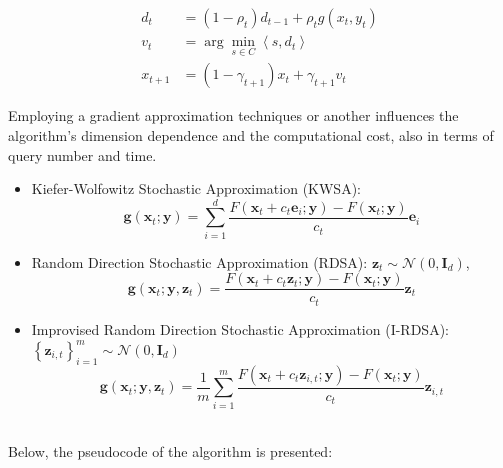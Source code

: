 \documentclass[10pt,twocolumn,letterpaper]{article}
\begin{document}
\[
\begin{aligned}
d_{t} & =\left(1-\rho_{t}\right) d_{t-1}+\rho_{t} g\left(x_{t}, y_{t}\right) \\
v_{t} & =\arg \min _{s \in C}\left\langle s, d_{t}\right\rangle \\
x_{t+1} & =\left(1-\gamma_{t+1}\right) x_{t}+\gamma_{t+1} v_{t}
\end{aligned}
\]

Employing a gradient approximation techniques or another influences the 
algorithm's dimension dependence and the computational cost, also in terms of query number and time.

\begin{itemize}
   \item {Kiefer-Wolfowitz Stochastic Approximation (KWSA):
   \[
   \mathbf{g}\left(\mathbf{x}_{t} ; \mathbf{y}\right)=\sum_{i=1}^{d} \frac{F\left(\mathbf{x}_{t}+c_{t} \mathbf{e}_{i} ; \mathbf{y}\right)-F\left(\mathbf{x}_{t} ; \mathbf{y}\right)}{c_{t}} \mathbf{e}_{i}
   \]}
   \item {Random Direction Stochastic Approximation (RDSA): \newline
    $\mathbf{z}_{t} \sim \mathcal{N}\left(0, \mathbf{I}_{d}\right)$,
   \[
   \mathbf{g}\left(\mathbf{x}_{t} ; \mathbf{y}, \mathbf{z}_{t}\right)=\frac{F\left(\mathbf{x}_{t}+c_{t} \mathbf{z}_{t} ; \mathbf{y}\right)-F\left(\mathbf{x}_{t} ; \mathbf{y}\right)}{c_{t}} \mathbf{z}_{t}
   \]}

   \item {Improvised Random Direction Stochastic Approximation (I-RDSA): \newline
   $\left\{\mathbf{z}_{i, t}\right\}_{i=1}^{m} \sim \mathcal{N}\left(0, \mathbf{I}_{d}\right)$ \newline
   \[
      \mathbf{g}\left(\mathbf{x}_{t} ; \mathbf{y}, \mathbf{z}_{t}\right)=\frac{1}{m} \sum_{i=1}^{m} \frac{F\left(\mathbf{x}_{t}+c_{t} \mathbf{z}_{i, t} ; \mathbf{y}\right)-F\left(\mathbf{x}_{t} ; \mathbf{y}\right)}{c_{t}} \mathbf{z}_{i, t}
   \]}
\end{itemize} \\

Below, the pseudocode of the algorithm is presented: \\
\end{document}
